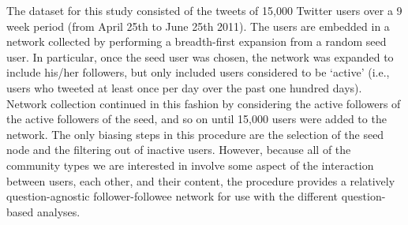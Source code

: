 The dataset for this study consisted of the tweets of 15,000 Twitter users over a 9 week period (from April 25th to June 25th 2011). The users are embedded in a network collected by performing a breadth-first expansion from a random seed user. In particular, once the seed user was chosen, the network was expanded to include his/her followers, but only included users considered to be `active' (i.e., users who tweeted at least once per day over the past one hundred days). Network collection continued in this fashion by considering the active followers of the active followers of the seed, and so on until 15,000 users were added to the network. The only biasing steps in this procedure are the selection of the seed node and the filtering out of inactive users. However, because all of the community types we are interested in involve some aspect of the interaction between users, each other, and their content, the procedure provides a relatively question-agnostic follower-followee network for use with the different question-based analyses.

